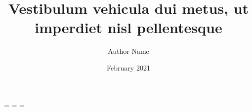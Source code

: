 \documentclass[fontsize=13bp,oneside,print]{proposal}
\title{Vestibulum vehicula dui metus, ut imperdiet nisl pellentesque}
\author{Author Name}
\date{February 2021}
\begin{document}
\newdimen\origiwspc
\newdimen\origiwstr
\origiwspc=\font %
\origiwstr=\font %
\font=\origiwstr
{}\origiwspc %



\begingroup
\mainmatter





\endgroup




\end{document}
